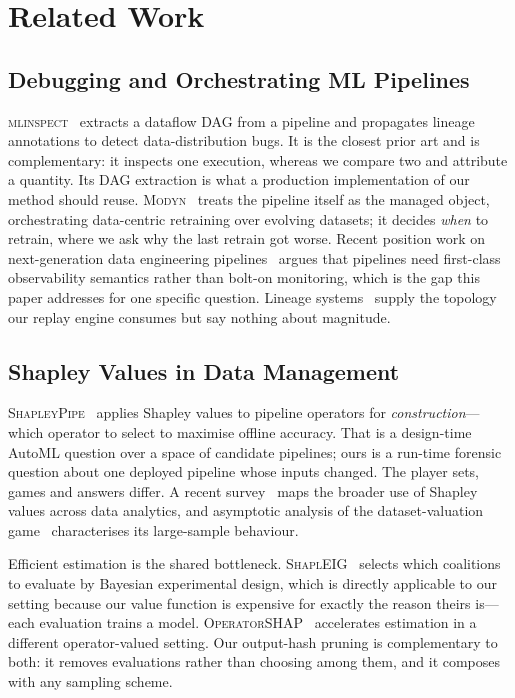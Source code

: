 \documentclass[conference]{IEEEtran}
\begin{document}
\section{Related Work}

\subsection{Debugging and Orchestrating ML Pipelines}

\textsc{mlinspect}~\cite{mlinspect,mlinspectj} extracts a dataflow DAG from a
pipeline and propagates lineage annotations to detect data-distribution bugs. It
is the closest prior art and is complementary: it inspects one execution, whereas
we compare two and attribute a quantity. Its DAG extraction is what a production
implementation of our method should reuse. \textsc{Modyn}~\cite{modyn} treats the
pipeline itself as the managed object, orchestrating data-centric retraining over
evolving datasets; it decides \emph{when} to retrain, where we ask why the last
retrain got worse. Recent position work on next-generation data engineering
pipelines~\cite{nextgen} argues that pipelines need first-class observability
semantics rather than bolt-on monitoring, which is the gap this paper addresses
for one specific question. Lineage systems~\cite{openlineage} supply the
topology our replay engine consumes but say nothing about magnitude.

\subsection{Shapley Values in Data Management}

\textsc{ShapleyPipe}~\cite{shapleypipe} applies Shapley values to pipeline
operators for \emph{construction}---which operator to select to maximise offline
accuracy. That is a design-time AutoML question over a space of candidate
pipelines; ours is a run-time forensic question about one deployed pipeline whose
inputs changed. The player sets, games and answers differ. A recent
survey~\cite{shapleysurvey} maps the broader use of Shapley values across data
analytics, and asymptotic analysis of the dataset-valuation
game~\cite{asymptotic} characterises its large-sample behaviour.

Efficient estimation is the shared bottleneck. \textsc{ShaplEIG}~\cite{shapleig}
selects which coalitions to evaluate by Bayesian experimental design, which is
directly applicable to our setting because our value function is expensive for
exactly the reason theirs is---each evaluation trains a model.
\textsc{OperatorSHAP}~\cite{operatorshap} accelerates estimation in a different
operator-valued setting. Our output-hash pruning is complementary to both: it
removes evaluations rather than choosing among them, and it composes with any
sampling scheme.
\end{document}
